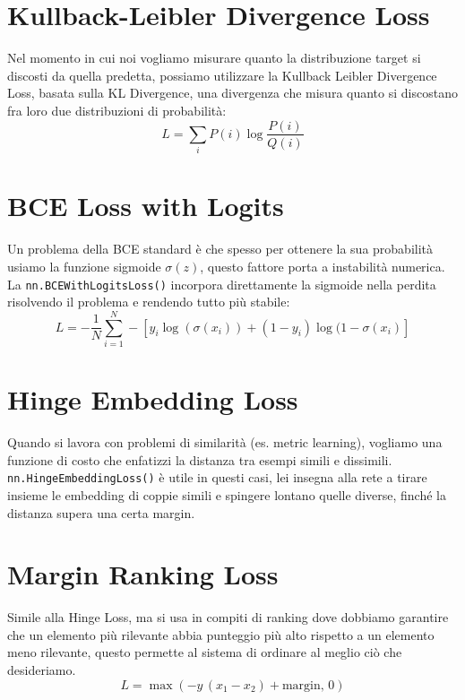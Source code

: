 \section{Kullback-Leibler Divergence Loss}
Nel momento in cui noi vogliamo misurare quanto la distribuzione target si discosti da quella predetta, possiamo utilizzare la Kullback Leibler Divergence Loss, basata sulla KL Divergence, una divergenza che misura quanto si discostano fra loro due distribuzioni di probabilità:
\begin{equation}
L = \sum_{i} P(i) \log \frac{P(i)}{Q(i)}
\end{equation}

\section{BCE Loss with Logits}
Un problema della BCE standard è che spesso per ottenere la sua probabilità usiamo la funzione sigmoide $\sigma(z)$, questo fattore porta a instabilità numerica. La \texttt{nn.BCEWithLogitsLoss()} incorpora direttamente la sigmoide nella perdita risolvendo il problema e rendendo tutto più stabile:
\begin{equation}
    L = - \frac{1}{N} \sum_{i=1}^{N} -\left[y_i \log(\sigma({x}_i)) + (1 - y_i) \log(1 - \sigma({x}_i) \right]
\end{equation}

\section{Hinge Embedding Loss}
Quando si lavora con problemi di similarità (es. metric learning), vogliamo una funzione di costo che enfatizzi la distanza tra esempi simili e dissimili. \texttt{nn.HingeEmbeddingLoss()} è utile in questi casi, lei insegna alla rete a tirare insieme le embedding di coppie simili e spingere lontano quelle diverse, finché la distanza supera una certa margin.

\section{Margin Ranking Loss}
Simile alla Hinge Loss, ma si usa in compiti di ranking dove dobbiamo garantire che un elemento più rilevante abbia punteggio più alto rispetto a un elemento meno rilevante, questo permette al sistema di ordinare al meglio ciò che desideriamo.
\begin{equation}
    L = \max(-y\,(x_1-x_2)+\text{margin},\,0) 
\end{equation}

